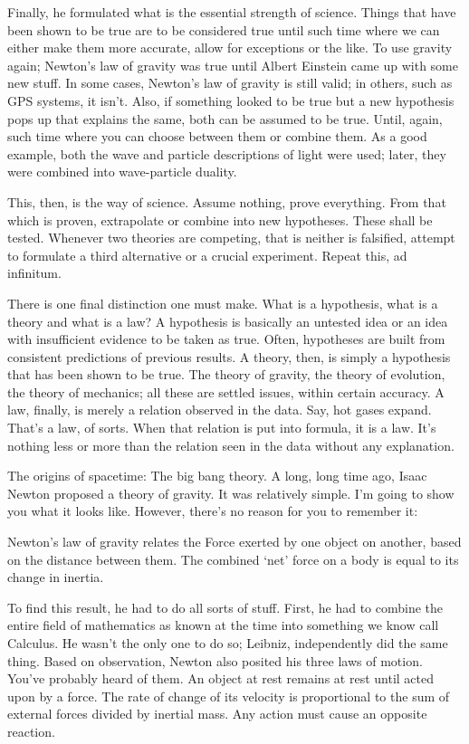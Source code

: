 \begin{multicols}{2}
Finally, he formulated what is the essential strength of science. Things that have been shown to be true are to be considered true until such time where we can either make them more accurate, allow for exceptions or the like. To use gravity again; Newton's law of gravity was true until Albert Einstein came up with some new stuff. In some cases, Newton's law of gravity is still valid; in others, such as GPS systems, it isn't. Also, if something looked to be true but a new hypothesis pops up that explains the same, both can be assumed to be true. Until, again, such time where you can choose between them or combine them. As a good example, both the wave and particle descriptions of light were used; later, they were combined into wave-particle duality.

This, then, is the way of science. Assume nothing, prove everything. From that which is proven, extrapolate or combine into new hypotheses. These shall be tested. Whenever two theories are competing, that is neither is falsified, attempt to formulate a third alternative or a crucial experiment. Repeat this, ad infinitum.

There is one final distinction one must make. What is a hypothesis, what is a theory and what is a law? A hypothesis is basically an untested idea or an idea with insufficient evidence to be taken as true. Often, hypotheses are built from consistent predictions of previous results. A theory, then, is simply a hypothesis that has been shown to be true. The theory of gravity, the theory of evolution, the theory of mechanics; all these are settled issues, within certain accuracy. A law, finally, is merely a relation observed in the data. Say, hot gases expand. That's a law, of sorts. When that relation is put into formula, it is a law. It's nothing less or more than the relation seen in the data without any explanation.

The origins of spacetime: The big bang theory.
A long, long time ago, Isaac Newton proposed a theory of gravity. It was relatively simple. I'm going to show you what it looks like. However, there's no reason for you to remember it:


Newton's law of gravity relates the Force exerted by one object on another, based on the distance between them. The combined `net' force on a body is equal to its change in inertia. 

To find this result, he had to do all sorts of stuff. First, he had to combine the entire field of mathematics as known at the time into something we know call Calculus. He wasn't the only one to do so; Leibniz, independently did the same thing. Based on observation, Newton also posited his three laws of motion. You've probably heard of them. An object at rest remains at rest until acted upon by a force. The rate of change of its velocity is proportional to the sum of external forces divided by inertial mass. Any action must cause an opposite reaction.


\end{multicols}
